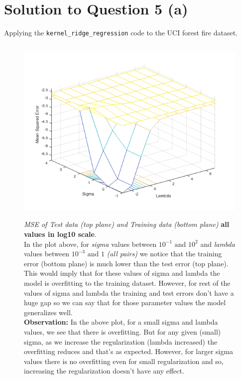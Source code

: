 \documentclass[a4paper,11pt]{article}
\begin{document}
\section*{Solution to Question 5 (a)}
Applying the \texttt{kernel\_ridge\_regression} code to the UCI forest fire dataset.
\inputminted[baselinestretch=1, fontsize=\small, breaklines=true]{octave}{../forest_fire_predict_new.m}
\begin{figure}[ht]
    \centering
    \includegraphics[width=1.1\linewidth]{../3d.png}
    \label{fig:mse}
    \caption{\textit{MSE of Test data (top plane) and Training data (bottom plane)} \textbf{all values in log10 scale}. \\In the plot above, for \textit{sigma} values between $10^{-1} \text{ and } 10^{2}$ and \textit{lambda} values between $10^{-3} \text{ and } 1$ \textit{(all pairs)} we notice that the training error (bottom plane) is much lower than the test error (top plane). This would imply that for these values of sigma and lambda the model is overfitting to the training dataset. However, for rest of the values of sigma and lambda the training and test errors don't have a huge gap so we can say that for those parameter values the model generalizes well.\\\textbf{Observation:} In the above plot, for a small sigma and lambda values, we see that there is overfitting. But for any given (small) sigma, as we increase the regularization (lambda increased) the overfitting reduces and that's as expected. However, for larger sigma values there is no overfitting even for small regularization and so, increasing the regularization doesn't have any effect. }
\end{figure}
\end{document}
